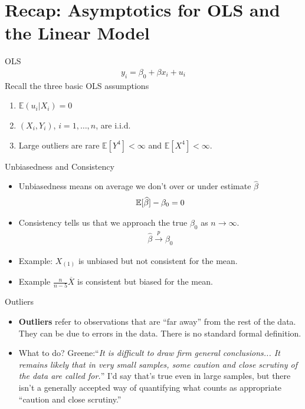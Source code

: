\section{Recap: Asymptotics for OLS and the Linear Model}


\begin{frame}{OLS}
\begin{align*}
y_i = \beta_0 + \beta x_i + u_i
\end{align*}
Recall the three basic OLS assumptions
\begin{enumerate}
\item $\mathbb{E}(u_i |X_i ) = 0$
\item $(X_i,Y_i)$, $i =1,\ldots,n$, are i.i.d.
\item Large outliers are rare $\mathbb{E}[Y^4]< \infty$ and $\mathbb{E}[X^4]<\infty$.
\end{enumerate}
\end{frame}

\begin{frame}{Unbiasedness and Consistency}
\begin{itemize}
\item Unbiasedness means on average we don't over or under estimate $\widehat{\beta}$
\begin{align*}
\mathbb{E}[\widehat{\beta} ] - \beta_0 = 0
\end{align*}
\item Consistency tells us that we approach the true $\beta_0$ as $n \rightarrow \infty$.
\begin{align*}
\widehat{\beta}  \overset{p}{\to} \beta_0
\end{align*}
\item Example: $X_{(1)}$ is unbiased but not consistent for the mean.
\item Example $\frac{n}{n-5} \overline{X}$ is consistent but biased for the mean.
\end{itemize}
\end{frame}



\begin{frame}{Outliers}
\begin{itemize}
	\item {\bf Outliers} refer to observations that are ``far away'' from the rest of the data. 
	They can be due to errors in the data.  There is no standard formal definition. 

	\medskip
	\item What to do? Greene:``\emph{It is difficult to draw firm general conclusions... It remains likely that in very
	small samples, some caution and close scrutiny of the data are called for.}'' I'd say that's true even in large samples,
	but there isn't a generally accepted way of quantifying what counts as appropriate ``caution and close scrutiny.''


\end{itemize}
\end{frame}



